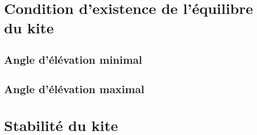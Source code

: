 \section{\textbf{Condition d'existence de l'équilibre du kite}} 
\label{sec:Ch1.4}

\subsection{Angle d'élévation minimal} 
\label{sec:Ch1.4.1}

\subsection{Angle d'élévation maximal}
\label{sec:Ch1.4.2}


\section{\textbf{Stabilité du kite}} 
\label{sec:Ch1.5}